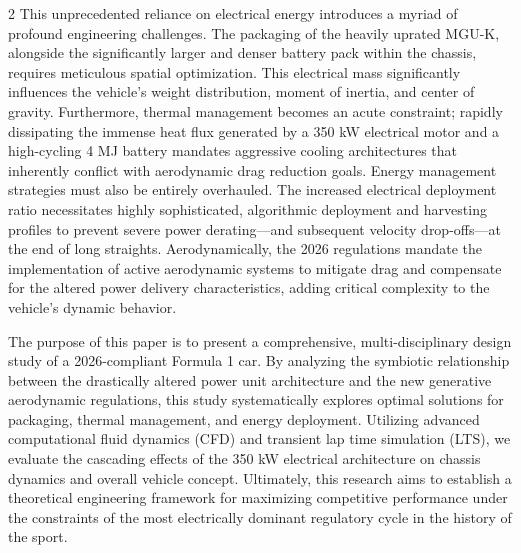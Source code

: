 \begin{multicols}{2}
This unprecedented reliance on electrical energy introduces a myriad of profound engineering challenges. The packaging of the heavily uprated MGU-K, alongside the significantly larger and denser battery pack within the chassis, requires meticulous spatial optimization. This electrical mass significantly influences the vehicle's weight distribution, moment of inertia, and center of gravity. Furthermore, thermal management becomes an acute constraint; rapidly dissipating the immense heat flux generated by a 350 kW electrical motor and a high-cycling 4 MJ battery mandates aggressive cooling architectures that inherently conflict with aerodynamic drag reduction goals. Energy management strategies must also be entirely overhauled. The increased electrical deployment ratio necessitates highly sophisticated, algorithmic deployment and harvesting profiles to prevent severe power derating—and subsequent velocity drop-offs—at the end of long straights. Aerodynamically, the 2026 regulations mandate the implementation of active aerodynamic systems to mitigate drag and compensate for the altered power delivery characteristics, adding critical complexity to the vehicle's dynamic behavior.

The purpose of this paper is to present a comprehensive, multi-disciplinary design study of a 2026-compliant Formula 1 car. By analyzing the symbiotic relationship between the drastically altered power unit architecture and the new generative aerodynamic regulations, this study systematically explores optimal solutions for packaging, thermal management, and energy deployment. Utilizing advanced computational fluid dynamics (CFD) and transient lap time simulation (LTS), we evaluate the cascading effects of the 350 kW electrical architecture on chassis dynamics and overall vehicle concept. Ultimately, this research aims to establish a theoretical engineering framework for maximizing competitive performance under the constraints of the most electrically dominant regulatory cycle in the history of the sport.
\end{multicols}
